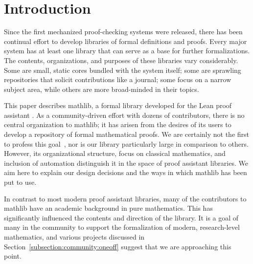\documentclass[sigplan]{acmart}\settopmatter{}
\newcommand{\mathlib}{\textsf{mathlib}\xspace}
\begin{document}

\maketitle



\section{Introduction}
\label{section:intro}

Since the first mechanized proof-checking systems were released, there has been continual effort to develop libraries of formal definitions and proofs.
Every major system has at least one library that can serve as a base for further formalizations.
The contents, organizations, and purposes of these libraries vary considerably.
Some are small, static cores bundled with the system itself;
some are sprawling repositories that solicit contributions like a journal; some focus on a narrow subject area, while others are more broad-minded in their topics.

This paper describes \mathlib, a formal library developed for the Lean proof assistant \cite{Mour15a}.
As a community-driven effort with dozens of contributors, there is no central organization to \mathlib;
it has arisen from the desires of its users to develop a repository of formal mathematical proofs.
We are certainly not the first to profess this goal~\cite{QED94}, nor is our library particularly large in comparison to others.
However, its organizational structure,
focus on classical mathematics,
and inclusion of automation
distinguish it in the space of proof assistant libraries.
We aim here to explain our design decisions and the ways in which \mathlib has been put to use.

In contrast to most modern proof assistant libraries, many of the contributors to \mathlib have an academic background in pure mathematics.
This has significantly influenced the contents and direction of the library.
It is a goal of many in the community to support the formalization of modern, research-level mathematics, and various projects discussed in Section~\ref{subsection:community:oneoff} suggest that we are approaching this point.
\end{document}
